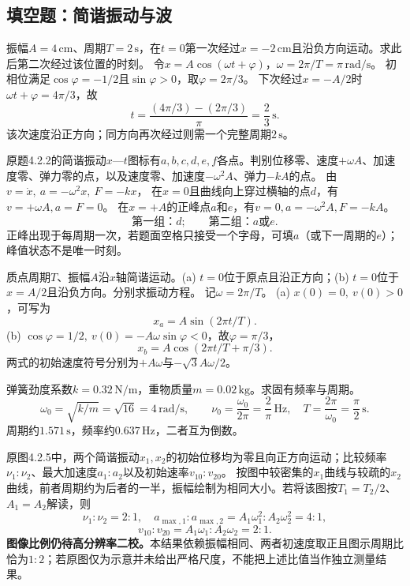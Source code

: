 \subsection{填空题：简谐振动与波}

\problemtext 振幅$A=4\,\mathrm{cm}$、周期$T=2\,\mathrm s$，在$t=0$第一次经过$x=-2\,\mathrm{cm}$且沿负方向运动。求此后第二次经过该位置的时刻。
\workings
令$x=A\cos(\omega t+\varphi)$，$\omega=2\pi/T=\pi\,\mathrm{rad/s}$。
初相位满足$\cos\varphi=-1/2$且$\sin\varphi>0$，取$\varphi=2\pi/3$。
下次经过$x=-A/2$时$\omega t+\varphi=4\pi/3$，故
\[
\boxed{t=\frac{(4\pi/3)-(2\pi/3)}{\pi}=\frac23\,\mathrm s}.
\]
\crosscheck 该次速度沿正方向；同方向再次经过则需一个完整周期$2\,\mathrm s$。

\problemtext 原题4.2.2的简谐振动$x$—$t$图标有$a,b,c,d,e,f$各点。判别位移零、速度$+\omega A$、加速度零、弹力零的点，以及速度零、加速度$-\omega^2A$、弹力$-kA$的点。
\workings
由
$v=\dot x,\ a=-\omega^2x,\ F=-kx$，
在$x=0$且曲线向上穿过横轴的点$d$，有$v=+\omega A,a=F=0$。
在$x=+A$的正峰点$a$和$e$，有$v=0,a=-\omega^2A,F=-kA$。
\[
\boxed{\text{第一组：}d;\qquad\text{第二组：}a\text{或}e}.
\]
\crosscheck 正峰出现于每周期一次，若题面空格只接受一个字母，可填$a$（或下一周期的$e$）；峰值状态不是唯一时刻。

\problemtext 质点周期$T$、振幅$A$沿$x$轴简谐运动。(a) $t=0$位于原点且沿正方向；(b) $t=0$位于$x=A/2$且沿负方向。分别求振动方程。
\workings
记$\omega=2\pi/T$。
(a) $x(0)=0,\ v(0)>0$，可写为
\[
\boxed{x_a=A\sin(2\pi t/T)}.
\]
(b) $\cos\varphi=1/2,\ v(0)=-A\omega\sin\varphi<0$，故$\varphi=\pi/3$，
\[
\boxed{x_b=A\cos(2\pi t/T+\pi/3)}.
\]
\crosscheck 两式的初始速度符号分别为$+A\omega$与$-\sqrt3 A\omega/2$。

\problemtext 弹簧劲度系数$k=0.32\,\mathrm{N/m}$，重物质量$m=0.02\,\mathrm{kg}$。求固有频率与周期。
\workings
\[
\omega_0=\sqrt{k/m}=\sqrt{16}=4\,\mathrm{rad/s},
\qquad
\boxed{\nu_0=\frac{\omega_0}{2\pi}=\frac2\pi\,\mathrm{Hz}},
\quad
\boxed{T=\frac{2\pi}{\omega_0}=\frac\pi2\,\mathrm s}.
\]
\crosscheck 周期约$1.571\,\mathrm s$，频率约$0.637\,\mathrm{Hz}$，二者互为倒数。

\problemtext 原图4.2.5中，两个简谐振动$x_1,x_2$的初始位移均为零且向正方向运动；比较频率$\nu_1:\nu_2$、最大加速度$a_1:a_2$以及初始速率$v_{10}:v_{20}$。
\workings
按图中较密集的$x_1$曲线与较疏的$x_2$曲线，前者周期约为后者的一半，振幅绘制为相同大小。若将该图按$T_1=T_2/2$、$A_1=A_2$解读，则
\[
\boxed{\nu_1:\nu_2=2:1},\quad
a_{\max,1}:a_{\max,2}
=A_1\omega_1^2:A_2\omega_2^2=\boxed{4:1},
\]
\[
\boxed{v_{10}:v_{20}=A_1\omega_1:A_2\omega_2=2:1}.
\]
\crosscheck \textbf{图像比例仍待高分辨率二校。}本结果依赖振幅相同、两者初速度取正且图示周期比恰为$1:2$；若原图仅为示意并未给出严格尺度，不能把上述比值当作独立测量结果。

